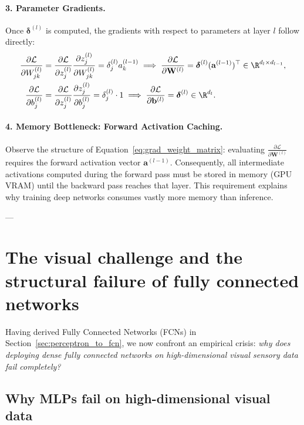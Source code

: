 \paragraph{3. Parameter Gradients.}
Once $\boldsymbol{\delta}^{(l)}$ is computed, the gradients with respect to parameters at layer $l$ follow directly:
\begin{align}
\frac{\partial \mathcal{L}}{\partial W_{jk}^{(l)}} &= \frac{\partial \mathcal{L}}{\partial z_j^{(l)}} \frac{\partial z_j^{(l)}}{\partial W_{jk}^{(l)}} = \delta_j^{(l)} a_k^{(l-1)} \implies \frac{\partial \mathcal{L}}{\partial \mathbf{W}^{(l)}} = \boldsymbol{\delta}^{(l)} (\mathbf{a}^{(l-1)})^\top \in \R^{d_l \times d_{l-1}}, \label{eq:grad_weight_matrix} \\
\frac{\partial \mathcal{L}}{\partial b_j^{(l)}} &= \frac{\partial \mathcal{L}}{\partial z_j^{(l)}} \frac{\partial z_j^{(l)}}{\partial b_j^{(l)}} = \delta_j^{(l)} \cdot 1 \implies \frac{\partial \mathcal{L}}{\partial \mathbf{b}^{(l)}} = \boldsymbol{\delta}^{(l)} \in \R^{d_l}. \label{eq:grad_bias_vector}
\end{align}

\paragraph{4. Memory Bottleneck: Forward Activation Caching.}
Observe the structure of Equation~\eqref{eq:grad_weight_matrix}: evaluating $\frac{\partial \mathcal{L}}{\partial \mathbf{W}^{(l)}}$ requires the forward activation vector $\mathbf{a}^{(l-1)}$. Consequently, all intermediate activations computed during the forward pass must be stored in memory (GPU VRAM) until the backward pass reaches that layer. This requirement explains why training deep networks consumes vastly more memory than inference.

---

\section{The visual challenge and the structural failure of fully connected networks}
\label{sec:failure_of_fc_on_images}

Having derived Fully Connected Networks (FCNs) in Section~\ref{sec:perceptron_to_fcn}, we now confront an empirical crisis: \textit{why does deploying dense fully connected networks on high-dimensional visual sensory data fail completely?}

\subsection{Why MLPs fail on high-dimensional visual data}
\label{sec:why_mlps_fail_images}

